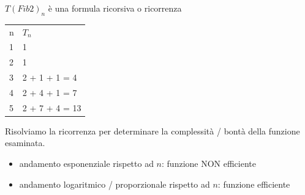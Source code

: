 \documentclass[tikz]{article}
\providecommand{\tightlist}{%
  \setlength{\itemsep}{0pt}\setlength{\parskip}{0pt}}
\begin{document}
{{{{$T(Fib2)_n$ è una formula ricorsiva o ricorrenza}

\begin{longtable}[]{@{}ll@{}}
\toprule
\begin{minipage}[t]{0.47\columnwidth}\raggedright\strut
{n}\strut
\end{minipage} & \begin{minipage}[t]{0.47\columnwidth}\raggedright\strut
$T_n$\strut
\end{minipage}\tabularnewline
\begin{minipage}[t]{0.47\columnwidth}\raggedright\strut
{1}\strut
\end{minipage} & \begin{minipage}[t]{0.47\columnwidth}\raggedright\strut
{1}\strut
\end{minipage}\tabularnewline
\begin{minipage}[t]{0.47\columnwidth}\raggedright\strut
{2}\strut
\end{minipage} & \begin{minipage}[t]{0.47\columnwidth}\raggedright\strut
{1}\strut
\end{minipage}\tabularnewline
\begin{minipage}[t]{0.47\columnwidth}\raggedright\strut
{3}\strut
\end{minipage} & \begin{minipage}[t]{0.47\columnwidth}\raggedright\strut
{2 + 1 + 1 = 4}\strut
\end{minipage}\tabularnewline
\begin{minipage}[t]{0.47\columnwidth}\raggedright\strut
{4}\strut
\end{minipage} & \begin{minipage}[t]{0.47\columnwidth}\raggedright\strut
{2 + 4 + 1 = 7}\strut
\end{minipage}\tabularnewline
\begin{minipage}[t]{0.47\columnwidth}\raggedright\strut
{5}\strut
\end{minipage} & \begin{minipage}[t]{0.47\columnwidth}\raggedright\strut
{2 + 7 + 4 = 13}\strut
\end{minipage}\tabularnewline
\bottomrule
\end{longtable}

{Risolviamo la ricorrenza per determinare la complessità / bontà della funzione esaminata.}

\begin{itemize}
\tightlist
\item
  {andamento esponenziale rispetto ad $n$: funzione NON efficiente}
\item
  {andamento logaritmico / proporzionale rispetto ad $n$: funzione
  efficiente}
\end{itemize}

}}}
\end{document}
